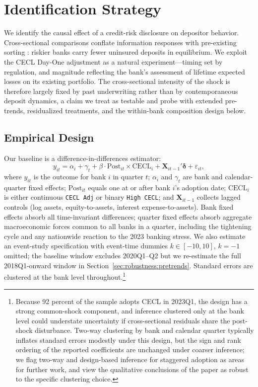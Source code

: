 \section{Identification Strategy}
\label{sec:identification}

We identify the causal effect of a credit-risk disclosure on depositor
behavior.  Cross-sectional comparisons conflate information responses
with pre-existing sorting \citep{covitz2004market, chen2022bank}: riskier
banks carry fewer uninsured deposits in equilibrium.  We exploit the
CECL Day-One adjustment as a natural experiment---timing set by
regulation, and magnitude reflecting the bank's assessment of lifetime
expected losses on its existing portfolio.  The cross-sectional intensity
of the shock is therefore largely fixed by past underwriting rather than
by contemporaneous deposit dynamics, a claim we treat as testable and
probe with extended pre-trends, residualized treatments, and the
within-bank composition design below.

\subsection{Empirical Design}
\label{sec:identification:did}

Our baseline is a difference-in-differences estimator:
\begin{equation}
  y_{it}
  = \alpha_i + \gamma_t
  + \beta \cdot \mathrm{Post}_{it} \times \mathrm{CECL}_i
  + \mathbf{X}_{it-1}'\boldsymbol{\delta}
  + \varepsilon_{it},
  \label{eq:did}
\end{equation}
where $y_{it}$ is the outcome for bank $i$ in quarter $t$; $\alpha_i$
and $\gamma_t$ are bank and calendar-quarter fixed effects;
$\mathrm{Post}_{it}$ equals one at or after bank $i$'s adoption date;
$\mathrm{CECL}_i$ is either continuous \texttt{CECL Adj} or binary
\texttt{High CECL}; and $\mathbf{X}_{it-1}$ collects lagged controls
(log assets, equity-to-assets, interest expense-to-assets).  Bank fixed
effects absorb all time-invariant differences; quarter fixed effects
absorb aggregate macroeconomic forces common to all banks in a quarter,
including the tightening cycle and any nationwide reaction to the 2023
banking stress.  We also estimate an event-study specification with
event-time dummies $k\in[-10,10]$, $k=-1$ omitted; the baseline window
excludes 2020Q1--Q2 but we re-estimate the full 2018Q1-onward window in
Section~\ref{sec:robustness:pretrends}.  Standard errors are clustered at
the bank level throughout.\footnote{Because 92 percent of the sample
adopts CECL in 2023Q1, the design has a strong common-shock component,
and inference clustered only at the bank level could understate
uncertainty if cross-sectional residuals share the post-shock
disturbance.  Two-way clustering by bank and calendar quarter typically
inflates standard errors modestly under this design, but the sign and
rank ordering of the reported coefficients are unchanged under coarser
inference; we flag two-way and design-based inference for staggered
adoption as areas for further work, and view the qualitative
conclusions of the paper as robust to the specific clustering choice.}

